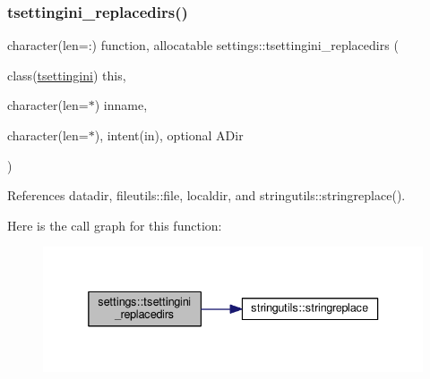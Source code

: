 \mbox{\label{namespacesettings_a3b2429bfa74ea486689b09597adc9791}} 
\subsubsection{\texorpdfstring{tsettingini\+\_\+replacedirs()}{tsettingini\_replacedirs()}}
{\footnotesize\ttfamily character(len=\+:) function, allocatable settings\+::tsettingini\+\_\+replacedirs (\begin{DoxyParamCaption}\item[{class(\mbox{\hyperlink{structsettings_1_1tsettingini}{tsettingini}})}]{this,  }\item[{character(len=$\ast$)}]{inname,  }\item[{character(len=$\ast$), intent(in), optional}]{A\+Dir }\end{DoxyParamCaption})}



References datadir, fileutils\+::file, localdir, and stringutils\+::stringreplace().

Here is the call graph for this function\+:
\nopagebreak
\begin{figure}[H]
\begin{center}
\leavevmode
\includegraphics[width=336pt]{namespacesettings_a3b2429bfa74ea486689b09597adc9791_cgraph}
\end{center}
\end{figure}
\mbox{\label{namespacesettings_a25f07dfd89b1bd5d8754f0c08c0077ef}} 
